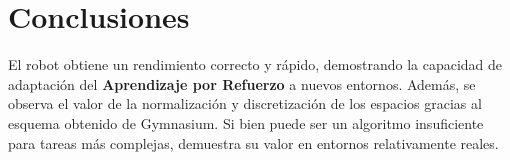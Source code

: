 \documentclass[12pt,a4paper]{article}
\begin{document}
\section{Conclusiones}

El robot obtiene un rendimiento correcto y rápido, demostrando la capacidad de adaptación del \textbf{Aprendizaje por Refuerzo} a nuevos entornos. Además, se observa el valor de la normalización y discretización de los espacios gracias al esquema obtenido de Gymnasium. Si bien puede ser un algoritmo insuficiente para tareas más complejas, demuestra su valor en entornos relativamente reales.
\end{document}
